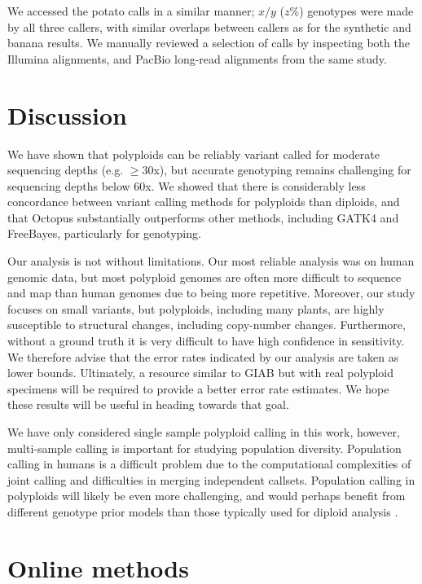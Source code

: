 \documentclass[notitlepage, twocolumn, 10pt]{article}
\begin{document}
We accessed the potato calls in a similar manner; $x/y$ ($z\%$) genotypes were made by all three callers, with similar overlaps between callers as for the synthetic and banana results. We manually reviewed a selection of calls by inspecting both the Illumina alignments, and PacBio long-read alignments from the same study.

\section*{Discussion}

We have shown that polyploids can be reliably variant called for moderate sequencing depths (e.g. $\ge30$x), but accurate genotyping remains challenging for sequencing depths below $60$x. We showed that there is considerably less concordance between variant calling methods for polyploids than diploids, and that Octopus substantially outperforms other methods, including GATK4 and FreeBayes, particularly for genotyping.

Our analysis is not without limitations. Our most reliable analysis was on human genomic data, but most polyploid genomes are often more difficult to sequence and map than human genomes due to being more repetitive. Moreover, our study focuses on small variants, but polyploids, including many plants, are highly susceptible to structural changes, including copy-number changes. Furthermore, without a  ground truth it is very difficult to have high confidence in sensitivity. We therefore advise that the error rates indicated by our analysis are taken as lower bounds. Ultimately, a resource similar to GIAB but with real polyploid specimens will be required to provide a better error rate estimates. We hope these results will be useful in heading towards that goal.

We have only considered single sample polyploid calling in this work, however, multi-sample calling is  important for studying population diversity. Population calling in humans is a difficult problem due to the computational complexities of joint calling and difficulties in merging independent callsets. Population calling in polyploids will likely be even more challenging, and would perhaps benefit from  different genotype prior models than those typically used for diploid analysis \cite{RN666}.




\section*{Online methods}\small
\end{document}

